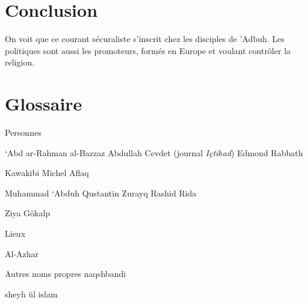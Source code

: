  
 \section{Conclusion}
 
 \begin{Synthesis}
   On voit que ce courant sécuraliste s'inscrit chez les disciples de 'Adbuh.
   Les politiques sont aussi les promoteurs, formés en Europe et voulant contrôler la religion.
   
 \end{Synthesis}
\hypertarget{glossaire-3}{%
\section{\texorpdfstring{{Glossaire}}{Glossaire}}\label{glossaire-3}}


{Personnes}

`Abd ar-Rahman al-Bazzaz Abdullah Cevdet (journal \emph{Içtihad}) Edmond
Rabbath

Kawakibi Michel Aflaq

Muhammad `Abduh Qustantin Zurayq Rashid Rida

Ziya Gökalp

{Lieux}

Al-Azhar

{Autres noms propres} naqshbandi

sheyh ül islam






 
